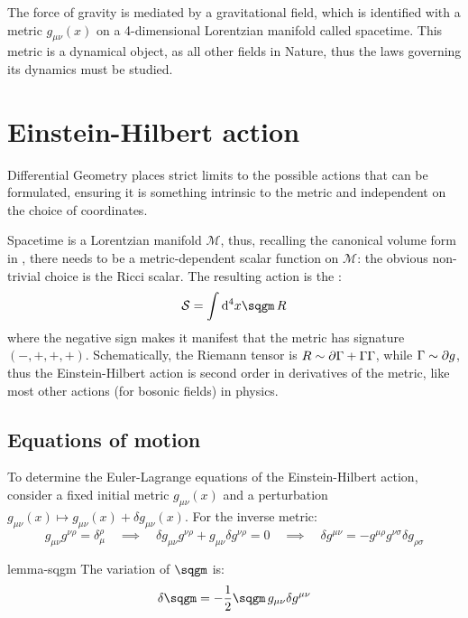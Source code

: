 
The force of gravity is mediated by a gravitational field, which is identified with a metric $ g_{\mu \nu}(x) $ on a 4-dimensional Lorentzian manifold called spacetime. This metric is a dynamical object, as all other fields in Nature, thus the laws governing its dynamics must be studied.

\section{Einstein-Hilbert action}

Differential Geometry places strict limits to the possible actions that can be formulated, ensuring it is something intrinsic to the metric and independent on the choice of coordinates.

Spacetime is a Lorentzian manifold $ \mathcal{M} $, thus, recalling the canonical volume form in , there needs to be a metric-dependent scalar function on $ \mathcal{M} $: the obvious non-trivial choice is the Ricci scalar. The resulting action is the :
\begin{equation}
  \mathcal{S} = \int \dd^4 x \sqgm \, R
  \label{eq:einstein-hilbert-action}
\end{equation}
where the negative sign makes it manifest that the metric has signature $ (-,+,+,+) $. Schematically, the Riemann tensor is $ R \sim \partial \Gamma + \Gamma \Gamma $, while $ \Gamma \sim \partial g $, thus the Einstein-Hilbert action is second order in derivatives of the metric, like most other actions (for bosonic fields) in physics.

\subsection{Equations of motion}

To determine the Euler-Lagrange equations of the Einstein-Hilbert action, consider a fixed initial metric $ g_{\mu \nu}(x) $ and a perturbation $ g_{\mu \nu}(x) \mapsto g_{\mu \nu}(x) + \delta g_{\mu \nu}(x) $. For the inverse metric:
\begin{equation*}
  g_{\mu \nu} g^{\nu \rho} = \delta_\mu^\rho
  \quad \implies \quad
  \delta g_{\mu \nu} g^{\nu \rho} + g_{\mu \nu} \delta g^{\nu \rho} = 0
  \quad \implies \quad
  \delta g^{\mu \nu} = - g^{\mu \rho} g^{\nu \sigma} \delta g_{\rho \sigma}
\end{equation*}

\begin{lemma}{}{lemma-sqgm}
  The variation of $ \sqgm $ is:
  \begin{equation}
    \delta \sqgm = - \frac{1}{2} \sqgm\, g_{\mu \nu} \delta g^{\mu \nu}
  \end{equation}
\end{lemma}

